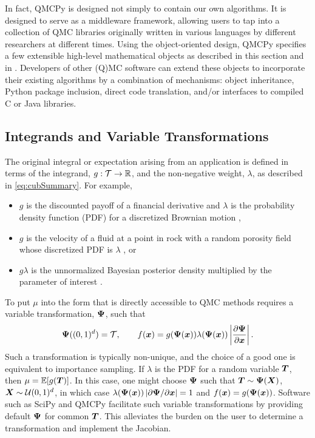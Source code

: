 \documentclass[graybox]{svmult}
\begin{document}
In fact, QMCPy is designed not simply to contain our own algorithms.  It is designed to serve as a middleware framework, allowing users to tap into a collection of QMC libraries originally written in various languages by different researchers at different times. Using the object-oriented design, QMCPy specifies a few  extensible high-level mathematical objects as described in this section and in \cite{ChoEtal22a}. Developers of other (Q)MC software can  extend these objects to incorporate their existing algorithms by a combination of mechanisms: object inheritance, Python package inclusion, direct code translation, and/or interfaces to compiled C or Java libraries.


\subsection{Integrands and Variable Transformations} \label{CDHJS:sec:integrands}
The original integral or expectation arising from an application is defined in terms of the integrand, $g :\mathcal{T} \to {\mathbb{R}}$, and the non-negative weight, $\lambda$, as described in \eqref{eq:cubSummary}.  For example,
\begin{itemize}
	\item $g$ is the discounted payoff of a financial derivative and $\lambda$ is the probability density function (PDF) for a discretized Brownian motion \cite{Gla03},

	\item  $g$ is the velocity of a fluid at a point in rock with a random porosity field whose discretized PDF is $\lambda$ \cite{KuoNuy16a}, or

	\item $g\lambda$ is the unnormalized Bayesian posterior density multiplied by the parameter of interest \cite{GelEtal13}.
\end{itemize}

To put $\mu$ into the form that is directly accessible to QMC methods requires a variable transformation, ${\boldsymbol{\Psi}}$, such that
\begin{equation*}
    {\boldsymbol{\Psi}}((0,1)^d) = {\mathcal{T}}, \qquad f({\boldsymbol{x}}) = g({\boldsymbol{\Psi}}({\boldsymbol{x}})) \lambda({\boldsymbol{\Psi}}({\boldsymbol{x}})) \left\vert\frac{\partial {\boldsymbol{\Psi}}}{\partial{\boldsymbol{x}}}\right\vert.
\end{equation*}
Such a transformation is typically non-unique, and the choice of a good one is equivalent to importance sampling.  If $\lambda$ is the PDF for a random variable ${\boldsymbol{T}}$, then $\mu = {\mathbb{E}}[g({\boldsymbol{T}})]$.  In this case, one might choose ${\boldsymbol{\Psi}}$ such that ${\boldsymbol{T}} \sim {\boldsymbol{\Psi}}({\boldsymbol{X}})$, ${\boldsymbol{X}} \sim {\mathcal{U}}(0,1)^d$, in which case $\lambda({\boldsymbol{\Psi}}({\boldsymbol{x}})) \left\vert\partial {\boldsymbol{\Psi}}/\partial{\boldsymbol{x}}\right\vert = 1$ and $f({\boldsymbol{x}}) = g({\boldsymbol{\Psi}}({\boldsymbol{x}}))$. Software such as SciPy and QMCPy facilitate such variable transformations by providing default ${\boldsymbol{\Psi}}$ for common ${\boldsymbol{T}}$. This alleviates the burden on the user to determine a transformation and implement the Jacobian.
\end{document}
